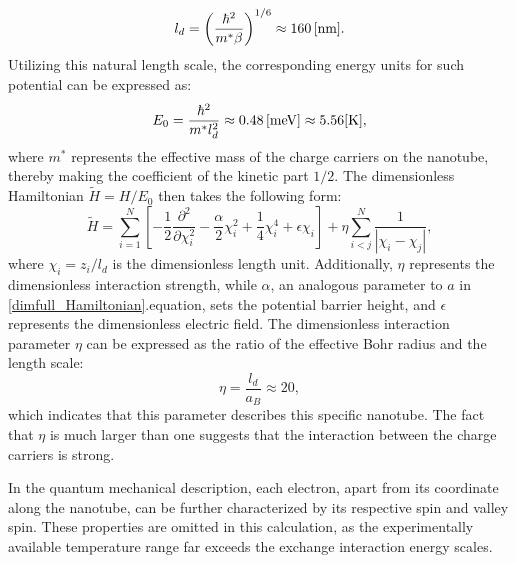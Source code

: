\documentclass[prb,twocolumn,showpacs,preprintnumbers,amsmath,amssymb, superscriptaddress]{revtex4-2}
\newcommand{\n}{N}
\newcommand{\1}{{1\hspace*{-0.5ex} \textrm{l} \hspace*{0.5ex}}}
\begin{document}
\begin{equation}
	l_d = \left( \frac{\hbar^2}{m^* \beta} \right)^{1/6} \approx 160 \,{\rm{ [nm]}}.
\end{equation}
Utilizing this natural length scale, the corresponding energy units for such potential can be expressed as:
\begin{equation}
	E_0 = \frac{\hbar^2}{m^* l_d^2} \approx 0.48 \,{\rm{ [meV]}} \approx 5.56 {\rm{ [K]}},
\end{equation}
where $m^*$ represents the effective mass of the charge carriers on the nanotube, thereby making the coefficient of the kinetic part $1/2$. The dimensionless Hamiltonian $\tilde{H} = H/E_0$ then takes the following form:
\begin{equation}\label{dimless_Hamiltonian}
 	\tilde{H} = \sum_{i = 1}^\n \left[ -\frac{1}{2}\frac{\partial^2}{\partial \chi_i^2} - \frac{\alpha}{2}\chi_i^2 + \frac{1}{4} \chi_i^4 + \epsilon \chi_i \right] + \eta \sum_{i < j}^\n \frac{1}{\left| \chi_i - \chi_j  \right|},
\end{equation}
where $\chi_i = z_i/l_d$ is the dimensionless length unit. Additionally, $\eta$ represents the dimensionless interaction strength, while $\alpha$, an analogous parameter to $a$ in \eqref{dimfull_Hamiltonian}.equation, sets the potential barrier height, and $\epsilon$ represents the dimensionless electric field. The dimensionless interaction parameter $\eta$ can be expressed as the ratio of the effective Bohr radius and the length scale:
\begin{equation}\label{dimless_interaction_param}
	\eta = \frac{l_d}{a_B} \approx 20,
\end{equation}
which indicates that this parameter describes this specific nanotube. The fact that $\eta$ is much larger than one suggests that the interaction between the charge carriers is strong.

In the quantum mechanical description, each electron, apart from its coordinate along the nanotube, can be further characterized by its respective spin and valley spin. These properties are omitted in this calculation, as the experimentally available temperature range far exceeds the exchange interaction energy scales.
\end{document}
